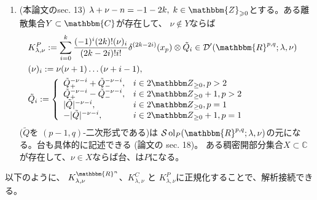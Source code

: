 \documentclass[a4paper]{article} %
\newcommand{\assign}{:=}
\newcommand{\nin}{\not\in}
\newcommand{\tmop}[1]{\ensuremath{\operatorname{#1}}}
\begin{document}
{\begin{enumerate}
 \item (本論文のsec. 13) $\lambda + \nu - n = - 1 - 2 k, \; k \in
 \mathbbm{Z}_{\geqslant 0}$とする。ある離散集合$Y\subset\mathbbm{C}$が存在して、
 $\nu\nin Y$ならば
 \begin{eqnarray}
 & K^P_{\lambda, \nu} \assign \sum_{i = 0}^k \frac{(- 1)^i (2 k) !
 (\nu)_i}{(2 k - 2 i) !i!} \delta^{(2 k - 2 i)} (x_p) \otimes \tilde{Q}_i
 \in \mathcal{D}' ( \mathbbm{R}^{p, q} ; \lambda, \nu) & \nonumber\\
 & (\nu)_i \assign \nu (\nu + 1) \ldots (\nu + i - 1), & \nonumber\\
 & \tilde{Q}_i \assign \left\{ \begin{array}{ll}
 \tilde{Q}_+^{- \nu - i} + \tilde{Q}_-^{- \nu - i}, & i \in 2 \Z_{\ge 0},
 p > 2\\
 \tilde{Q}_+^{- \nu - i} - \tilde{Q}_-^{- \nu - i}, & i \in 2 \Z_{\ge 0}
 + 1, p > 2\\
 | \tilde{Q} |^{- \nu - i}, & i \in 2 \Z_{\ge 0}, p = 1\\
 - | \tilde{Q} |^{- \nu - i}, & i \in 2 \Z_{\ge 0} + 1, p = 1
 \end{array} \right. & \nonumber
 \end{eqnarray}
 ($\tilde{Q}$を $( p - 1, q)$-二次形式である)は
 $\mathcal{S} \tmop{ol}_P ( \mathbbm{R}^{p, q} ; \lambda, \nu)$の元になる。台も具体的に記述できる
 (論文の sec. 18)。
 ある稠密開部分集合$X\subset\mathbb{C}$が存在して、$\nu\in X$ならば台、は$P$になる。
\end{enumerate}}{\hspace*{\fill}}{\medskip}

以下のように、
$K_{\lambda,
\nu}^{\mathbbm{R}^n}$、$K_{\lambda, \nu}^C$ と $K_{\lambda, \nu}^P$に正規化することで、解析接続できる。
\end{document}
